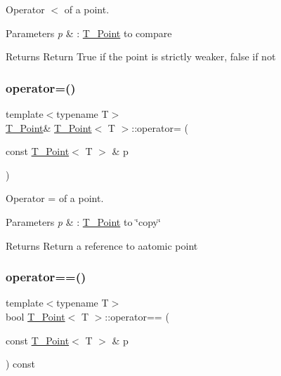 Operator $<$ of a point. 


\begin{DoxyParams}{Parameters}
{\em p} & \+: \hyperlink{classPoint}{T_Point} to compare \\
\hline
\end{DoxyParams}
\begin{DoxyReturn}{Returns}
Return True if the point is strictly weaker, false if not 
\end{DoxyReturn}
\mbox{\label{classPoint_a2e9aa15e5410f48937c9d474262dab3e}} 
\subsubsection{\texorpdfstring{operator=()}{operator=()}}
{\footnotesize\ttfamily template$<$typename T$>$ \\
\hyperlink{classPoint}{T_Point}\& \hyperlink{classPoint}{T_Point}$<$ T $>$\+::operator= (\begin{DoxyParamCaption}\item[{const \hyperlink{classPoint}{T_Point}$<$ T $>$ \&}]{p }\end{DoxyParamCaption})\hspace{0.3cm}{\ttfamily [inline]}}



Operator = of a point. 


\begin{DoxyParams}{Parameters}
{\em p} & \+: \hyperlink{classPoint}{T_Point} to \char`\"{}copy\char`\"{} \\
\hline
\end{DoxyParams}
\begin{DoxyReturn}{Returns}
Return a reference to aatomic point 
\end{DoxyReturn}
\mbox{\label{classPoint_aaaaac8f25a60bca6ae5ddbb34fd3e9d8}} 
\subsubsection{\texorpdfstring{operator==()}{operator==()}}
{\footnotesize\ttfamily template$<$typename T$>$ \\
bool \hyperlink{classPoint}{T_Point}$<$ T $>$\+::operator== (\begin{DoxyParamCaption}\item[{const \hyperlink{classPoint}{T_Point}$<$ T $>$ \&}]{p }\end{DoxyParamCaption}) const\hspace{0.3cm}{\ttfamily [inline]}}




